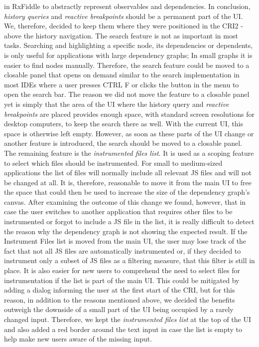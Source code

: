 in RxFiddle to abstractly represent observables and dependencies. In conclusion, \emph{history queries} and \emph{reactive breakpoints} should be a permanent part of the UI. We, therefore, decided to keep them where they were positioned in the CRI2 - above the history navigation.
The search feature is not as important in most tasks. Searching and highlighting a specific node, its dependencies or dependents, is only useful for applications with large dependency graphs; In small graphs it is easier to find nodes manually. Therefore, the search feature could be moved to a closable panel that opens on demand similar to the search implementation in most IDEs where a user presses CTRL F or clicks the button in the menu to open the search bar. The reason we did not move the feature to a closable panel yet is simply that the area of the UI where the history query and \emph{reactive breakpoints} are placed provides enough space, with standard screen resolutions for desktop computers, to keep the search there as well. With the current UI, this space is otherwise left empty. However, as soon as these parts of the UI change or another feature is introduced, the search should be moved to a closable panel. The remaining feature is the \emph{instrumented files list}. It is used as a scoping feature to select which files should be instrumented. For small to medium-sized applications the list of files will normally include all relevant JS files and will not be changed at all. It is, therefore, reasonable to move it from the main UI to free the space that could then be used to increase the size of the dependency graph's canvas. After examining the outcome of this change we found, however, that in case the user switches to another application that requires other files to be instrumented or forgot to include a JS file in the list, it is really difficult to detect the reason why the dependency graph is not showing the expected result. If the Instrument Files list is moved from the main UI, the user may lose track of the fact that not all JS files are automatically instrumented or, if they decided to instrument only a subset of JS files as a filtering measure, that this filter is still in place. It is also easier for new users to comprehend the need to select files for instrumentation if the list is part of the main UI. This could be mitigated by adding a dialog informing the user at the first start of the CRI, but for this reason, in addition to the reasons mentioned above, we decided the benefits outweigh the downside of a small part of the UI being occupied by a rarely changed input. Therefore, we kept the \emph{instrumented files list} at the top of the UI and also added a red border around the text input in case the list is empty to help make new users aware of the missing input.


